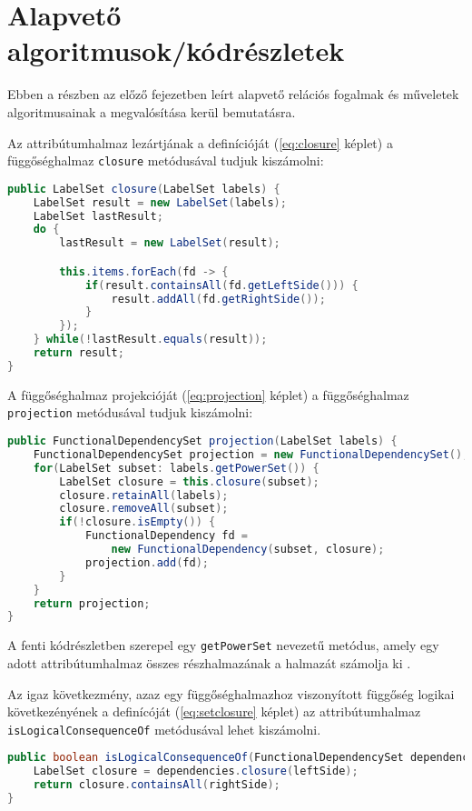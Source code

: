 \section{Alapvető algoritmusok/kódrészletek}

Ebben a részben az előző fejezetben leírt alapvető relációs fogalmak és műveletek algoritmusainak a megvalósítása kerül bemutatásra.

Az attribútumhalmaz lezártjának a definícióját (\ref{eq:closure} képlet) a függőséghalmaz \lstinline{closure} metódusával tudjuk kiszámolni:

\linespread{1}
\begin{lstlisting}[language=Java]
public LabelSet closure(LabelSet labels) {
	LabelSet result = new LabelSet(labels);
	LabelSet lastResult;
	do {
		lastResult = new LabelSet(result);

		this.items.forEach(fd -> {
			if(result.containsAll(fd.getLeftSide())) {
				result.addAll(fd.getRightSide());
			}
		});
	} while(!lastResult.equals(result));
	return result;
}
\end{lstlisting}

A függőséghalmaz projekcióját (\ref{eq:projection} képlet) a függőséghalmaz \lstinline{projection} metódusával tudjuk kiszámolni:

\linespread{1}
\begin{lstlisting}[language=Java]
public FunctionalDependencySet projection(LabelSet labels) {
	FunctionalDependencySet projection = new FunctionalDependencySet();
	for(LabelSet subset: labels.getPowerSet()) {
		LabelSet closure = this.closure(subset);
		closure.retainAll(labels);
		closure.removeAll(subset);
		if(!closure.isEmpty()) {
			FunctionalDependency fd = 
			    new FunctionalDependency(subset, closure);
			projection.add(fd);
		}
	}
	return projection;
}
\end{lstlisting}

A fenti kódrészletben szerepel egy \lstinline{getPowerSet} nevezetű metódus, amely egy adott attribútumhalmaz összes részhalmazának a halmazát számolja ki \parencite{baeldung2020}.

Az igaz következmény, azaz egy függőséghalmazhoz viszonyított függőség logikai következényének a definícóját (\ref{eq:setclosure} képlet) az attribútumhalmaz \lstinline{isLogicalConsequenceOf} metódusával lehet kiszámolni.

\linespread{1}
\begin{lstlisting}[float,floatplacement=H,language=Java]
public boolean isLogicalConsequenceOf(FunctionalDependencySet dependencies) {
	LabelSet closure = dependencies.closure(leftSide);
	return closure.containsAll(rightSide);
}
\end{lstlisting}

